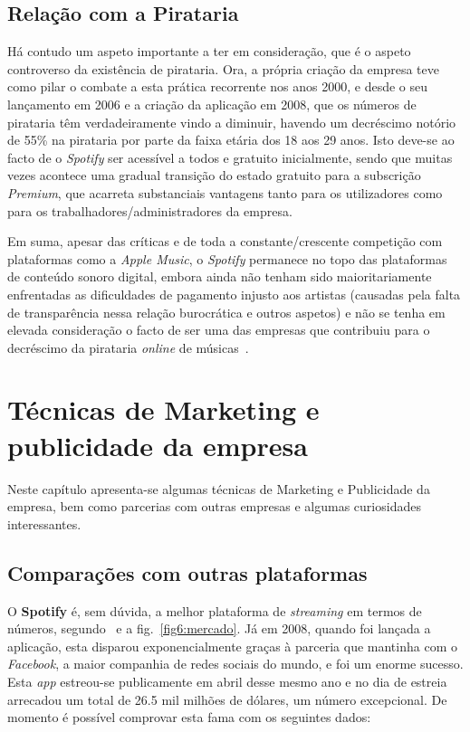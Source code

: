 \documentclass{report}
\begin{document}
\section{Relação com a Pirataria}

Há contudo um aspeto importante a ter em consideração, que é o aspeto controverso da existência de pirataria. Ora, a própria criação da empresa teve como pilar o combate a esta prática recorrente nos anos 2000, e desde o seu lançamento em 2006 e a criação da aplicação em 2008, que os números de pirataria têm verdadeiramente vindo a diminuir, havendo um decréscimo notório de 55\% na pirataria por parte da faixa etária dos 18 aos 29 anos. Isto deve-se ao facto de o \textit{Spotify} ser acessível a todos e gratuito inicialmente, sendo que muitas vezes acontece uma gradual transição do estado gratuito para a subscrição \textit{Premium}, que acarreta substanciais vantagens tanto para os utilizadores como para os trabalhadores/administradores da empresa. 

Em suma, apesar das críticas e de toda a constante/crescente competição com plataformas como a \textit{Apple Music}, o \textit{Spotify} permanece no topo das plataformas de conteúdo sonoro digital, embora ainda não tenham sido maioritariamente enfrentadas as dificuldades de pagamento injusto aos artistas (causadas pela falta de transparência nessa relação burocrática e outros aspetos) e não se tenha em elevada consideração o facto de ser uma das empresas que contribuiu para o decréscimo da pirataria \textit{online} de músicas~\cite{tiagomonteiro&miguelmonteiro&joãofranco2019}.



\chapter{Técnicas de Marketing e publicidade da empresa}
\label{chap.Técnicas de Marketing e publicidade da empresa}
Neste capítulo apresenta-se algumas técnicas de Marketing e Publicidade da empresa, bem como parcerias com outras empresas e algumas curiosidades interessantes.

\section{Comparações com outras plataformas}
O \textbf{Spotify} é, sem dúvida, a melhor plataforma de \textit{streaming} em termos de números, segundo~\cite{mansooriqbal2000} e a fig.~\ref{fig6:mercado}. Já em 2008, quando foi lançada a aplicação, esta disparou exponencialmente graças à parceria que mantinha com o \textit{Facebook}, a maior companhia de redes sociais do mundo, e foi um enorme sucesso. Esta \textit{app} estreou-se publicamente em abril desse mesmo ano e no dia de estreia arrecadou um total de 26.5 mil milhões de dólares, um número excepcional. De momento é possível comprovar esta fama com os seguintes dados:
\end{document}
